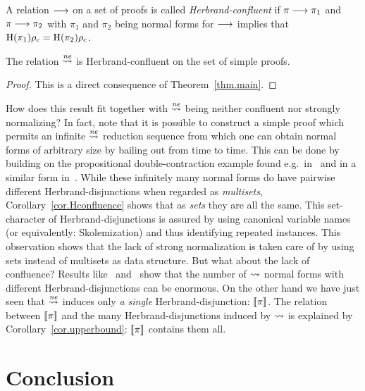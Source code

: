 \documentclass{LMCS}
\theoremstyle{plain}
\theoremstyle{definition}
\newcommand{\Hcont}[1]{[\mkern-3mu[#1]\mkern-3mu]}
\begin{document}
\begin{defi}
A relation $\longrightarrow$ on a set of proofs is called \emph{Herbrand-confluent}
if $\pi\longrightarrow\pi_1$ and $\pi\longrightarrow\pi_2$ with $\pi_1$ and $\pi_2$ being
normal forms for $\longrightarrow$ implies that
$\mathrm{H}(\pi_1)\rho_\mathrm{c}=\mathrm{H}(\pi_2)\rho_\mathrm{c}$.
\end{defi}

\begin{cOr}\label{cor.Hconfluence}
The relation $\stackrel{\mathit{ne}}{\rightsquigarrow}$ is Herbrand-confluent on the set of simple proofs.
\end{cOr}
\begin{proof}
This is a direct consequence of Theorem~\ref{thm.main}.
\end{proof}

How does this result fit together with $\stackrel{\mathit{ne}}{\rightsquigarrow}$ being neither
confluent nor strongly normalizing? In fact, note that it is possible to construct a simple proof which permits
an infinite $\stackrel{\mathit{ne}}{\rightsquigarrow}$ reduction sequence from which one can obtain
normal forms of arbitrary size by bailing out from time to time. This can be done by building on the propositional double-contraction
example found e.g.\ in~\cite{Danos97New,Gallier93Constructive,Urban00Classical} and
in a similar form in~\cite{Zucker74Correspondence}. While these infinitely many normal forms do have pairwise different Herbrand-disjunctions
when regarded as {\em multisets}, Corollary~\ref{cor.Hconfluence} shows that as {\em sets} they are all the same.
This set-character of Herbrand-disjunctions is assured by using canonical variable
names (or equivalently: Skolemization) and thus identifying repeated instances.
This observation shows that the lack of strong normalization is taken care of
by using sets instead of multisets as data structure. But what about the lack of
confluence? Results like~\cite{Baaz11Nonconfluence} and~\cite{Hetzl12Computational} show
that the number of $\rightsquigarrow$ normal forms with different Herbrand-disjunctions
can be enormous. On the other hand we have just seen that $\stackrel{\mathit{ne}}{\rightsquigarrow}$ induces only
{\em a single} Herbrand-disjunction: $\Hcont{\pi}$. The relation between $\Hcont{\pi}$
and the many Herbrand-disjunctions induced by $\rightsquigarrow$ is explained by Corollary~\ref{cor.upperbound}:
$\Hcont{\pi}$ contains them all.

\section{Conclusion}\label{sec.conclusion}
\end{document}
